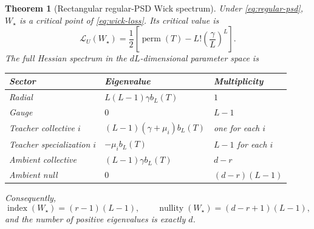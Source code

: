 \documentclass[11pt]{article}
\newtheorem{theorem}{Theorem}[section]
\newcommand{\perm}{\operatorname{perm}}
\newcommand{\ind}{\operatorname{index}}
\newcommand{\nul}{\operatorname{nullity}}
\begin{document}
\begin{theorem}[Rectangular regular-PSD Wick spectrum]
\label{thm:wick-rectangular}
Under \eqref{eq:regular-psd}, $W_\star$ is a critical point of \eqref{eq:wick-loss}.  Its critical value is
\begin{equation}
\mathcal L_U(W_\star)
=\frac12\left[
\perm(T)-L!\left(\frac{\gamma}{L}\right)^L
\right].
\end{equation}
The full Hessian spectrum in the $dL$-dimensional parameter space is
\begin{center}
\begin{tabular}{@{}lll@{}}
\toprule
Sector & Eigenvalue & Multiplicity\\
\midrule
Radial & $L(L-1)\gamma b_L(T)$ & $1$\\
Gauge & $0$ & $L-1$\\
Teacher collective $i$ & $(L-1)(\gamma+\mu_i)b_L(T)$ & one for each $i$\\
Teacher specialization $i$ & $-\mu_i b_L(T)$ & $L-1$ for each $i$\\
Ambient collective & $(L-1)\gamma b_L(T)$ & $d-r$\\
Ambient null & $0$ & $(d-r)(L-1)$\\
\bottomrule
\end{tabular}
\end{center}
Consequently,
\begin{equation}
\boxed{\ind(W_\star)=(r-1)(L-1)},
\qquad
\boxed{\nul(W_\star)=(d-r+1)(L-1)},
\label{eq:wick-inertia}
\end{equation}
and the number of positive eigenvalues is exactly $d$.
\end{theorem}
\end{document}
